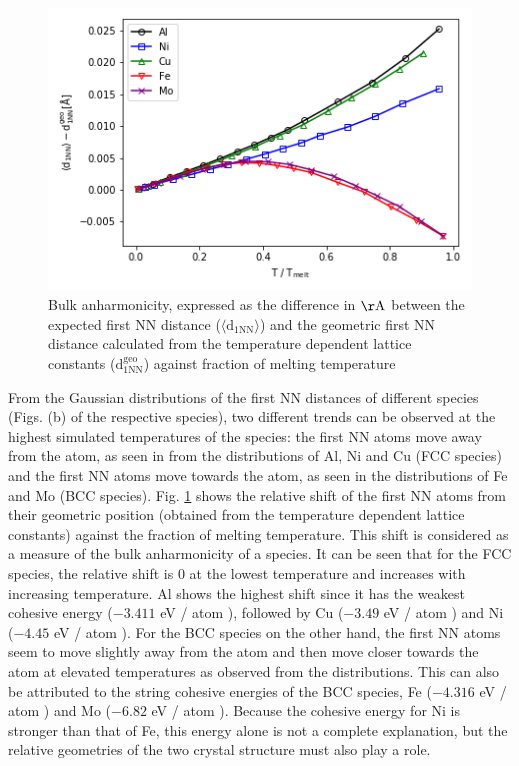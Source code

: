 \documentclass{article}
\begin{document}
\begin{figure}[htp]
\centering
\includegraphics[scale=0.65]{bulk_anharm_all}
\caption{Bulk anharmonicity, expressed as the difference in $\mathrm{\AA}$ between the expected first NN distance ($\langle \mathrm{d_{1NN}} \rangle$) and the geometric first NN distance calculated from the temperature dependent lattice constants ($\mathrm{d_{1NN}^{geo}}$) against fraction of melting temperature}
\label{fig:20}
\end{figure}

From the Gaussian distributions of the first NN distances of different species (Figs. (b) of the respective species), two different trends can be observed at the highest simulated temperatures of the species: the first NN atoms move away from the atom, as seen in from the distributions of Al, Ni and Cu (FCC species) and the first NN atoms move towards the atom, as seen in the distributions of Fe and Mo (BCC species). Fig. \ref{fig:20} shows the relative shift of the first NN atoms from their geometric position (obtained from the temperature dependent lattice constants) against the fraction of melting temperature. This shift is considered as a measure of the bulk anharmonicity of a species. It can be seen that for the FCC species, the relative shift is 0 at the lowest temperature and increases with increasing temperature. Al shows the highest shift since it has the weakest cohesive energy ($-3.411$ eV / atom \cite{Mendelev2009a}), followed by Cu ($-3.49$ eV / atom \cite{Mendelev2008}) and Ni ($-4.45$ eV / atom \cite{Mishin2004}). For the BCC species on the other hand, the first NN atoms seem to move slightly away from the atom and then move closer towards the atom at elevated temperatures as observed from the distributions. This can also be attributed to the string cohesive energies of the BCC species, Fe ($-4.316$ eV / atom  \cite{Ackland1997}) and Mo ($-6.82$ eV / atom \cite{Zhou2004}). Because the cohesive energy for Ni is stronger than that of Fe, this energy alone is not a complete explanation, but the relative geometries of the two crystal structure must also play a role.
\end{document}
